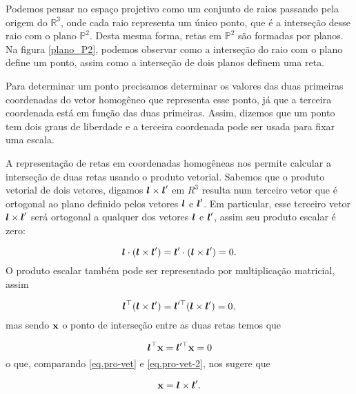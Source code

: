 Podemos pensar no espaço projetivo como um conjunto de raios passando pela origem do $\mathbb{R}^3$, onde cada raio representa um único ponto, que é a interseção desse raio com o plano $\mathbb{P}^2$. Desta mesma forma, retas em $\mathbb{P}^2$ são formadas por planos. Na figura \ref{plano_P2}, podemos observar como a interseção do raio com o plano define um ponto, assim como a interseção de dois planos definem uma reta.


Para determinar um ponto precisamos determinar os valores das duas primeiras coordenadas do vetor homogêneo que representa esse ponto, já que a terceira coordenada está em função das duas primeiras. Assim, dizemos que um ponto tem dois graus de liberdade e a terceira coordenada pode ser usada para fixar uma escala.
\\


A representação de retas em coordenadas homogêneas nos permite calcular a interseção de duas retas usando o produto vetorial. Sabemos que o produto vetorial de dois vetores, digamos $\boldsymbol{l}\times\boldsymbol{l}'$ em $R^3$ resulta num terceiro vetor que é ortogonal ao plano definido pelos vetores $\boldsymbol{l}$ e $\boldsymbol{l}'$. Em particular, esse terceiro vetor $\boldsymbol{l}\times\boldsymbol{l}'$ será ortogonal a qualquer dos vetores $\boldsymbol{l}$ e $\boldsymbol{l}'$, assim seu produto escalar é zero:

\begin{equation*}
\boldsymbol{l}\cdot(\boldsymbol{l}\times\boldsymbol{l}')=\boldsymbol{l}'\cdot(\boldsymbol{l}\times\boldsymbol{l}')=0.
\end{equation*}
O produto escalar também pode ser representado por multiplicação matricial, assim

\begin{equation}\label{eq.pro-vet}
\boldsymbol{l}^\top(\boldsymbol{l}\times\boldsymbol{l}')=\boldsymbol{l}'^\top(\boldsymbol{l}\times\boldsymbol{l}')=0,
\end{equation}
mas sendo $\mathbf{x}$ o ponto de interseção entre as duas retas temos que

\begin{equation}\label{eq.pro-vet-2}
\boldsymbol{l}^\top\mathbf{x}=\boldsymbol{l}'^\top\mathbf{x}=0
\end{equation}
o que, comparando \ref{eq.pro-vet} e \ref{eq.pro-vet-2}, nos sugere que

\begin{equation*}
\mathbf{x}=\boldsymbol{l}\times\boldsymbol{l}'.
\end{equation*}


